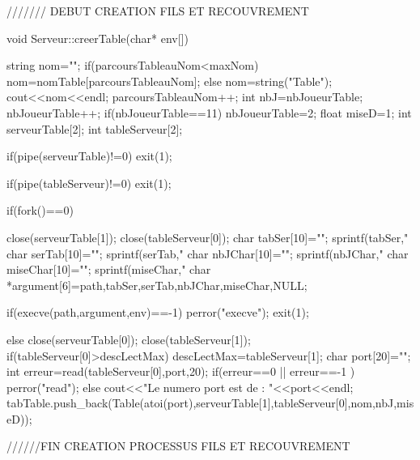 \documentclass{article}
\begin{document}
/////// DEBUT CREATION FILS ET RECOUVREMENT

void Serveur::creerTable(char* env[]){
  string nom="";
  if(parcoursTableauNom<maxNom){
    nom=nomTable[parcoursTableauNom];
  }
  else{
    nom=string("Table");
  }
  cout<<nom<<endl;
  parcoursTableauNom++;
  int nbJ=nbJoueurTable;
  nbJoueurTable++;
  if(nbJoueurTable==11){
    nbJoueurTable=2;
  }
  float miseD=1;
  int serveurTable[2];
  int tableServeur[2];


  if(pipe(serveurTable)!=0)
    exit(1);
  
  if(pipe(tableServeur)!=0)
    exit(1);

  if(fork()==0){
    close(serveurTable[1]);
    close(tableServeur[0]);
    char tabSer[10]="";
    sprintf(tabSer,"%
    char serTab[10]="";
    sprintf(serTab,"%
    char nbJChar[10]="";
    sprintf(nbJChar,"%
    char miseChar[10]="";
    sprintf(miseChar,"%
    char *argument[6]={path,tabSer,serTab,nbJChar,miseChar,NULL};
    
     if(execve(path,argument,env)==-1){
      perror("execve");
      exit(1);
      }
  }
  else{
    close(serveurTable[0]);
    close(tableServeur[1]);
    if(tableServeur[0]>descLectMax){
      descLectMax=tableServeur[1];
    }
    char port[20]="";
    int erreur=read(tableServeur[0],port,20);
    if(erreur==0 || erreur==-1 ){
      perror("read");
    }
    else{
      cout<<"Le numero port est de : "<<port<<endl;
      tabTable.push_back(Table(atoi(port),serveurTable[1],tableServeur[0],nom,nbJ,miseD));
    }
  }
}

//////FIN CREATION PROCESSUS FILS ET RECOUVREMENT
\end{document}
